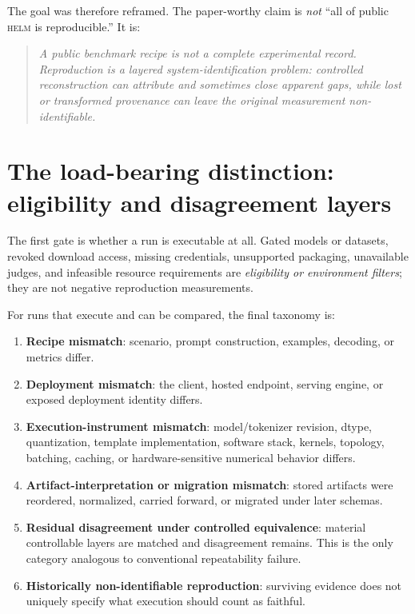\documentclass[11pt]{report}
\begin{document}
The goal was therefore reframed. The paper-worthy claim is \emph{not} ``all of
public \textsc{helm} is reproducible.'' It is:

\begin{quote}\itshape
A public benchmark recipe is not a complete experimental record. Reproduction is a
layered system-identification problem: controlled reconstruction can attribute and
sometimes close apparent gaps, while lost or transformed provenance can leave the
original measurement non-identifiable.
\end{quote}

\section{The load-bearing distinction: eligibility and disagreement layers}
\label{sec:distinction}

The first gate is whether a run is executable at all. Gated models or datasets,
revoked download access, missing credentials, unsupported packaging, unavailable
judges, and infeasible resource requirements are \emph{eligibility or environment
filters}; they are not negative reproduction measurements.

For runs that execute and can be compared, the final taxonomy is:

\begin{enumerate}[nosep]
  \item \textbf{Recipe mismatch}: scenario, prompt construction, examples, decoding,
        or metrics differ.
  \item \textbf{Deployment mismatch}: the client, hosted endpoint, serving engine,
        or exposed deployment identity differs.
  \item \textbf{Execution-instrument mismatch}: model/tokenizer revision, dtype,
        quantization, template implementation, software stack, kernels, topology,
        batching, caching, or hardware-sensitive numerical behavior differs.
  \item \textbf{Artifact-interpretation or migration mismatch}: stored artifacts
        were reordered, normalized, carried forward, or migrated under later schemas.
  \item \textbf{Residual disagreement under controlled equivalence}: material
        controllable layers are matched and disagreement remains. This is the only
        category analogous to conventional repeatability failure.
  \item \textbf{Historically non-identifiable reproduction}: surviving evidence does
        not uniquely specify what execution should count as faithful.
\end{enumerate}
\end{document}

